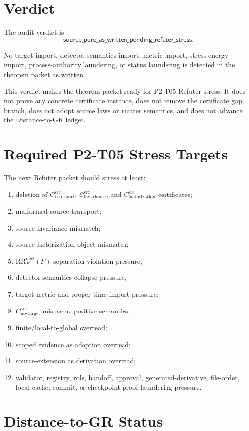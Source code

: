 \documentclass[11pt]{article}
\newcommand{\AuditVerdict}{\mathsf{source\_pure\_as\_written\_pending\_refuter\_stress}}
\newcommand{\CTr}{C_{\mathrm{transport}}^{\mathrm{src}}}
\newcommand{\CInv}{C_{\mathrm{invariance}}^{\mathrm{src}}}
\newcommand{\CFact}{C_{\mathrm{factorization}}^{\mathrm{src}}}
\newcommand{\CNTI}{C_{\mathrm{no\text{-}target}}^{\mathrm{src}}}
\newcommand{\RREObj}{\mathrm{RR}_{E}^{\mathrm{decl}}}
\begin{document}
\section{Verdict}

The audit verdict is
\[
  \AuditVerdict .
\]

No target import, detector-semantics import, metric import, stress-energy
import, process-authority laundering, or status laundering is detected in the
theorem packet as written.

This verdict makes the theorem packet ready for P2-T05 Refuter stress. It does
not prove any concrete certificate instance, does not remove the certificate
gap branch, does not adopt source laws or matter semantics, and does not
advance the Distance-to-GR ledger.

\section{Required P2-T05 Stress Targets}

The next Refuter packet should stress at least:

\begin{enumerate}[label=(\alph*)]
  \item deletion of \(\CTr\), \(\CInv\), and \(\CFact\) certificates;
  \item malformed source transport;
  \item source-invariance mismatch;
  \item source-factorization object mismatch;
  \item \(\RREObj(F)\) separation violation pressure;
  \item detector-semantics collapse pressure;
  \item target metric and proper-time import pressure;
  \item \(\CNTI\) misuse as positive semantics;
  \item finite/local-to-global overread;
  \item scoped evidence as adoption overread;
  \item source-extension as derivation overread;
  \item validator, registry, role, handoff, approval, generated-derivative,
        file-order, local-cache, commit, or checkpoint proof-laundering
        pressure.
\end{enumerate}

\section{Distance-to-GR Status}
\end{document}
